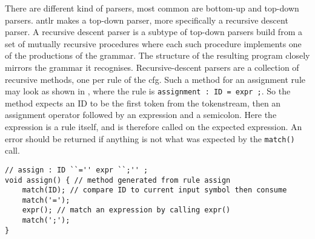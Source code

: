 There are different kind of parsers, most common are bottom-up and top-down parsers.
\acrshort{antlr} makes a top-down parser, more specifically a recursive descent parser.
A recursive descent parser is a subtype of top-down parsers build from a set of mutually recursive procedures where each such procedure implements one of the productions of the grammar.
The structure of the resulting program closely mirrors the grammar it recognises. \citep{Recursive_programming}
Recursive-descent parsers are a collection of recursive methods, one per rule of the \acrshort{cfg}. 
Such a method for an assignment rule may look as shown in , where the rule is \texttt{assignment : ID = expr ;}.
So the method expects an ID to be the first token from the tokenstream, then an assignment operator followed by an expression and a semicolon.
Here the expression is a rule itself, and is therefore called on the expected expression.
An error should be returned if anything is not what was expected by the \texttt{match()} call.
\begin{lstlisting}[caption=Example a recursive descent parser method,frame=tlrb,label={lst:rdpmethod}]
// assign : ID ``='' expr ``;'' ;
void assign() { // method generated from rule assign
    match(ID); // compare ID to current input symbol then consume
    match('=');
    expr(); // match an expression by calling expr()
    match(';');
}
\end{lstlisting}
